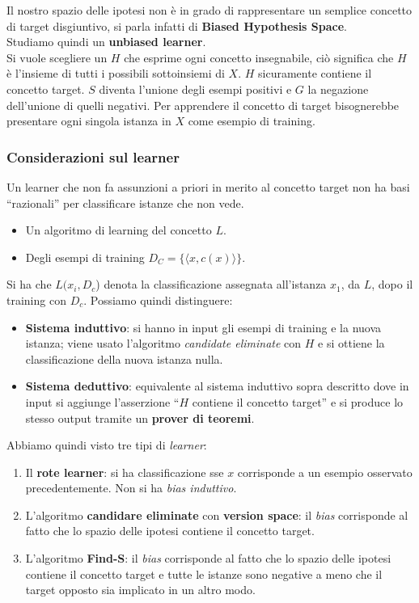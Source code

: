 Il nostro spazio delle ipotesi non è in grado di rappresentare un semplice
concetto di target disgiuntivo, si parla infatti di \textbf{Biased Hypothesis
  Space}. \\
Studiamo quindi un \textbf{unbiased learner}.\\Si vuole scegliere un $H$ che
esprime ogni concetto insegnabile, ciò significa che $H$ è l'insieme di tutti i
possibili sottoinsiemi di $X$. $H$ sicuramente contiene il concetto target. $S$
diventa l'unione degli esempi positivi e $G$ la negazione dell'unione di quelli
negativi. Per apprendere il concetto di target bisognerebbe presentare ogni
singola istanza in $X$ come esempio di training.\\
\subsubsection{Considerazioni sul learner}
Un learner che non fa assunzioni a priori in merito al concetto target non ha
basi ``razionali'' per classificare istanze che non vede.\\
\begin{itemize}
  \item Un algoritmo di learning del concetto $L$.
  \item Degli esempi di training $D_C=\{\langle x, c(x)\rangle\}$.
\end{itemize}
Si ha che $L(x_i, D_c$) denota la classificazione assegnata all'istanza $x_1$, da
$L$, dopo il training con $D_c$.
Possiamo quindi distinguere:
\begin{itemize}
  \item \textbf{Sistema induttivo}: si hanno in input gli esempi di
  training e la nuova istanza; viene usato l'algoritmo \textit{candidate
    eliminate} con $H$ e si ottiene la classificazione della nuova istanza
  nulla.
  \item \textbf{Sistema deduttivo}: equivalente al sistema induttivo sopra
  descritto dove in input si aggiunge l'asserzione ``$H$ contiene il concetto
  target'' e si produce lo stesso output tramite un \textbf{prover di teoremi}.
\end{itemize}
Abbiamo quindi visto tre tipi di \textit{learner}:
\begin{enumerate}
  \item Il \textbf{rote learner}: si ha classificazione sse $x$ corrisponde
  a un esempio osservato precedentemente. Non si ha \textit{bias induttivo}.
  \item L'algoritmo \textbf{candidare eliminate} con \textbf{version space}:
  il \textit{bias} corrisponde al fatto che lo spazio delle ipotesi contiene il concetto target. 
  \item L'algoritmo \textbf{Find-S}: il \textit{bias} corrisponde al fatto
  che lo spazio delle ipotesi contiene il concetto target e tutte le istanze
  sono negative a meno che il target opposto sia implicato in un altro modo. 
\end{enumerate}
\newpage

